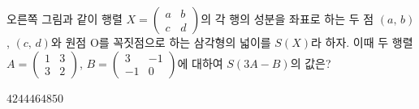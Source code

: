 \hspace*{2mm}\begin{minipage}[t]{\dimexpr\linewidth-2mm\relax}\vspace{0pt}
\noindent\begin{minipage}[t]{0.58\linewidth}\vspace{0pt}\raggedright 오른쪽 그림과 같이 행렬 $X=\begin{pmatrix} a & b \\ c & d \end{pmatrix}$의 각 행의 성분을 좌표로 하는 두 점 $(a,\,b)$, $(c,\,d)$와 원점 $\mathrm{O}$를 꼭짓점으로 하는 삼각형의 넓이를 $S(X)$라 하자. 이때 두 행렬 $A=\begin{pmatrix} 1 & 3 \\ 3 & 2 \end{pmatrix}$, $B=\begin{pmatrix} 3 & -1 \\ -1 & 0 \end{pmatrix}$에 대하여 $S(3A-B)$의 값은?\end{minipage}\hfill\begin{minipage}[t]{0.4\linewidth}\vspace{0pt}\centering \resizebox{\ifdim\width>\linewidth\linewidth\else\width\fi}{!}{}\end{minipage}\par
\begin{choices32}{$42$}{$44$}{$46$}{$48$}{$50$}\end{choices32}\end{minipage}
